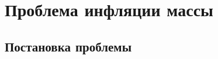 %
%




\section{Проблема инфляции массы}\label{sec:2.3}

\subsection{Постановка проблемы}\label{sub:2.3.1}

